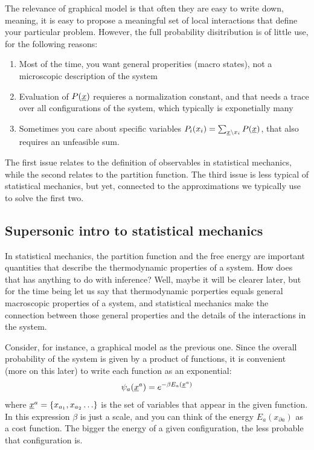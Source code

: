 The relevance of graphical model is that often they are easy to write down, meaning, it is easy to propose a meaningful set of local interactions that define your particular problem. However, the full probability disitribution is of little use, for the following reasons:
\begin{enumerate}
 \item Most of the time, you want general properities (macro states), not a microscopic description of the system
 \item Evaluation of $P(\underline{x})$ requieres a normalization constant, and that needs a trace over all configurations of the system, which typically is exponetially many
 \item Sometimes you care about specific variables $P_i(x_i) = \sum_{\underline{x} \setminus x_i} P(\underline{x})$, that also requires an unfeasible sum.
\end{enumerate}
The first issue relates to the definition of observables in statistical mechanics, while the second relates to the partition function. The third issue is less typical of statistical mechanics, but yet, connected to the approximations we typically use to solve the first two.


\subsection{Supersonic intro to statistical mechanics}

In statistical mechanics, the partition function and the free energy are important quantities that describe the thermodynamic properties of a system. How does that has anything to do with inference? Well, maybe it will be clearer later, but for the time being let us say that thermodynamic porperties equals general macroscopic properties of a system, and statistical mechanics make the connection between those general properties and the details of the interactions in the system.

Consider, for instance, a graphical model as the previous one. Since the overall probability of the system is given by a product of functions, it is convenient (more on this later) to write each function as an exponential:
\[ \psi_a(\underline{x}^a) = e^{ -\beta E_a(\underline{x}^a) }\]
where $\underline{x}^a  = \{x_{a_1},x_{a_2}\ldots \}$ is the set of variables that appear in the given function. In this expression $\beta$ is just a scale, and you can think of the energy $E_a(x_{\partial a})$ as a cost function. The bigger the energy of a given configuration, the less probable that configuration is.

